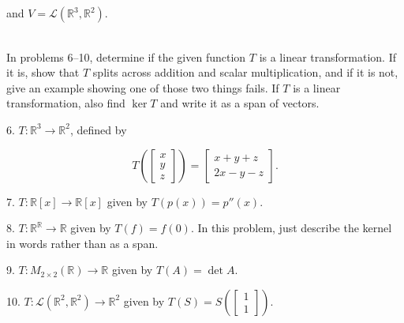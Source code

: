 \documentclass{article}
\begin{document}
and $V = \mathcal{L}(\mathbb{R}^3, \mathbb{R}^2)$.

~\\

In problems 6--10, determine if the given function $T$ is a linear transformation. If it is, show that $T$ splits across addition and scalar multiplication, and if it is not, give an example showing one of those two things fails. If $T$ is a linear transformation, also find $\ker T$ and write it as a span of vectors.

6. $T : \mathbb{R}^3 \to \mathbb{R}^2$, defined by

$$
	T \left( \left[\begin{array}{c} x \\ y \\ z \end{array}\right] \right) = \left[\begin{array}{c} x + y + z \\ 2x - y - z \end{array}\right].
$$

7. $T : \mathbb{R}[x] \to \mathbb{R}[x]$ given by $T(p(x)) = p''(x)$.

8. $T : \mathbb{R}^\mathbb{R} \to \mathbb{R}$ given by $T(f) = f(0)$. In this problem, just describe the kernel in words rather than as a span.

9. $T : M_{2 \times 2}(\mathbb{R}) \to \mathbb{R}$ given by $T(A) = \det A$.

10. $T : \mathcal{L}(\mathbb{R}^2, \mathbb{R}^2) \to \mathbb{R}^2$ given by $T(S) = S\left( \left[\begin{array}{c} 1 \\ 1 \end{array}\right] \right)$.
\end{document}
